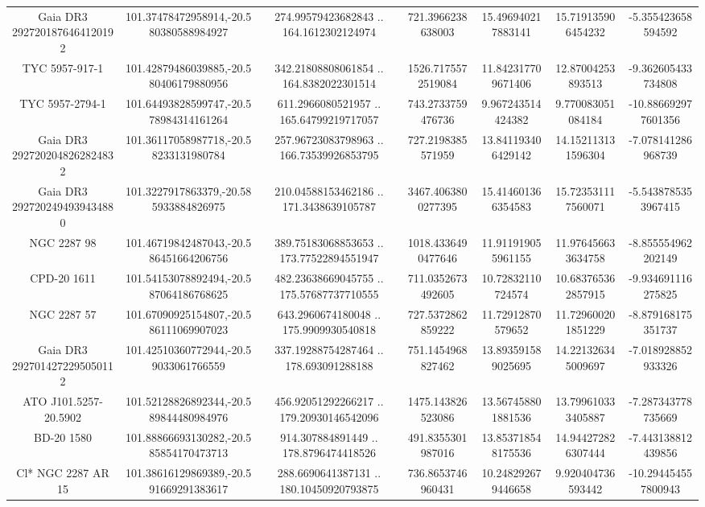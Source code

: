 \begin{table}
\begin{tabular}{ccccccc}
Gaia DR3 2927201876464120192 & 101.37478472958914,-20.580380588984927 & 274.99579423682843 .. 164.1612302124974 & 721.3966238638003 & 15.496940217883141 & 15.719135906454232 & -5.355423658594592 \\
TYC 5957-917-1 & 101.42879486039885,-20.580406179880956 & 342.21808808061854 .. 164.8382022301514 & 1526.7175572519084 & 11.842317709671406 & 12.87004253893513 & -9.362605433734808 \\
TYC 5957-2794-1 & 101.64493828599747,-20.578984314161264 & 611.2966080521957 .. 165.64799219717057 & 743.2733759476736 & 9.967243514424382 & 9.770083051084184 & -10.886692977601356 \\
Gaia DR3 2927202048262824832 & 101.36117058987718,-20.58233131980784 & 257.96723083798963 .. 166.73539926853795 & 727.2198385571959 & 13.841193406429142 & 14.152113131596304 & -7.078141286968739 \\
Gaia DR3 2927202494939434880 & 101.3227917863379,-20.585933884826975 & 210.04588153462186 .. 171.3438639105787 & 3467.4063800277395 & 15.414601366354583 & 15.723531117560071 & -5.5438785353967415 \\
NGC  2287    98 & 101.46719842487043,-20.586451664206756 & 389.75183068853653 .. 173.77522894551947 & 1018.4336490477646 & 11.911919055961155 & 11.976456633634758 & -8.855554962202149 \\
CPD-20  1611 & 101.54153078892494,-20.587064186768625 & 482.23638669045755 .. 175.57687737710555 & 711.0352673492605 & 10.72832110724574 & 10.683765362857915 & -9.934691116275825 \\
NGC  2287    57 & 101.67090925154807,-20.586111069907023 & 643.2960674180048 .. 175.9909930540818 & 727.5372862859222 & 11.72912870579652 & 11.729600201851229 & -8.879168175351737 \\
Gaia DR3 2927014272295050112 & 101.42510360772944,-20.59033061766559 & 337.19288754287464 .. 178.693091288188 & 751.1454968827462 & 13.893591589025695 & 14.221326345009697 & -7.018928852933326 \\
ATO J101.5257-20.5902 & 101.52128826892344,-20.589844480984976 & 456.92051292266217 .. 179.20930146542096 & 1475.143826523086 & 13.567458801881536 & 13.799610333405887 & -7.287343778735669 \\
BD-20  1580 & 101.88866693130282,-20.585854170473713 & 914.307884891449 .. 178.8796474418526 & 491.8355301987016 & 13.853718548175536 & 14.944272826307444 & -7.443138812439856 \\
Cl* NGC 2287     AR      15 & 101.38616129869389,-20.591669291383617 & 288.6690641387131 .. 180.10450920793875 & 736.8653746960431 & 10.248292679446658 & 9.920404736593442 & -10.294454557800943 \\

\end{tabular}
\end{table}
